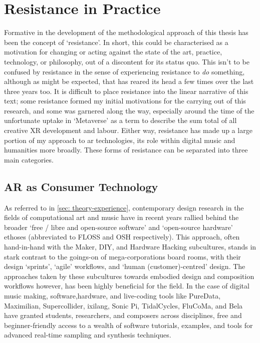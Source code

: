 \section{Resistance in Practice}\label{sec: method-resistance}
Formative in the development of the methodological approach of this thesis has been the concept of `resistance'. In short, this could be characterised as a motivation for changing or acting against the state of the art, practice, technology, or philosophy, out of a discontent for its status quo. This isn't to be confused by resistance in the sense of experiencing resistance to \textit{do} something, although as might be expected, that has reared its head a few times over the last three years too. It is difficult to place resistance into the linear narrative of this text; some resistance formed my initial motivations for the carrying out of this research, and some was garnered along the way, especially around the time of the unfortunate uptake in `Metaverse' as a term to describe the sum total of all creative XR development and labour. Either way, resistance has made up a large portion of my approach to \gls{ar} technologies, its role within digital music and humanities more broadly. These forms of resistance can be separated into three main categories.

\subsection{AR as Consumer Technology}\label{sec: method-resistance-maker}
As referred to in \autoref{sec: theory-experience}, contemporary design research in the fields of computational art and music have in recent years rallied behind the broader `free / libre and open-source software' and `open-source hardware' ethoses (abbreviated to FLOSS and OSH respectively). This approach, often hand-in-hand with the Maker, DIY, and Hardware Hacking subcultures, stands in stark contrast to the goings-on of mega-corporations board rooms, with their design `sprints', `agile' workflows, and `human (customer)-centred' design. The approaches taken by these subcultures towards embodied design and composition workflows however, has been highly beneficial for the field. In the case of digital music making, software,hardware, and live-coding tools like PureData, Maximilian, Supercollider, ixilang, Sonic Pi, TidalCycles, FluCoMa, and Bela have granted students, researchers, and composers across disciplines, free and beginner-friendly access to a wealth of software tutorials, examples, and tools for advanced real-time sampling and synthesis techniques.

